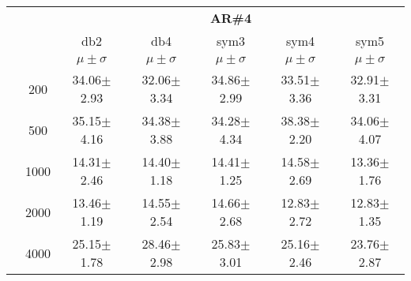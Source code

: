 \begin{table}[H]
\begin{tabular}{|c|c|c c c c c|}
\cline{3-7}
\multicolumn{2}{c|}{\multirow{3}{*}{}} & \multicolumn{5}{c|}{\textbf{AR\#4}}   \\\cline{3-7} 

\multicolumn{2}{c|}{}  & db2 & db4 & sym3 & sym4 & sym5 \\\cline{3-7}
\multicolumn{2}{c|}{}& $\mu \pm \sigma$ & $\mu \pm \sigma$ & $\mu \pm \sigma$ & $\mu \pm \sigma$ & $\mu \pm \sigma$ \\\hline

\multicolumn{1}{|c|}{ \multirow{5}{*}{\rotatebox[origin=c]{90}{\textbf{Neurônios}}} }
&200	&34.06$\pm$2.93	&32.06$\pm$3.34	&34.86$\pm$2.99	&33.51$\pm$3.36	&32.91$\pm$3.31	\\\cline{2-7}
&500	&35.15$\pm$4.16	&34.38$\pm$3.88	&34.28$\pm$4.34	&38.38$\pm$2.20	&34.06$\pm$4.07	\\\cline{2-7}
&1000	&14.31$\pm$2.46	&14.40$\pm$1.18	&14.41$\pm$1.25	&14.58$\pm$2.69	&13.36$\pm$1.76	\\\cline{2-7}
&2000	&13.46$\pm$1.19	&14.55$\pm$2.54	&14.66$\pm$2.68	&12.83$\pm$2.72	&12.83$\pm$1.35	\\\cline{2-7}
&4000	&25.15$\pm$1.78	&28.46$\pm$2.98	&25.83$\pm$3.01	&25.16$\pm$2.46	&23.76$\pm$2.87	

\\\midrule
	\end{tabular}
\end{table}


